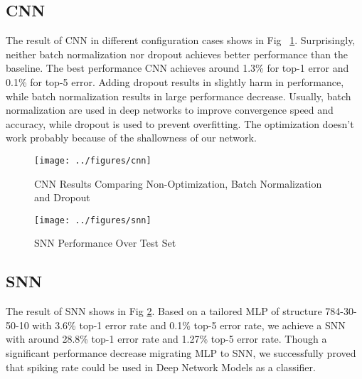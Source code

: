 \documentclass[10pt,twocolumn,letterpaper]{article}
\begin{document}
\subsection{ CNN }
The result of CNN in different configuration cases shows in Fig ~\ref{fig:cnn}. Surprisingly, neither batch normalization nor dropout achieves better performance than the baseline. The best performance CNN achieves around 1.3\% for top-1 error and 0.1\% for top-5 error. Adding dropout results in slightly harm in performance, while batch normalization results in large performance decrease. Usually, batch normalization are used in deep networks to improve convergence speed and accuracy, while dropout is used to prevent overfitting. The optimization doesn't work probably because of the shallowness of our network. 
\begin{figure}[t]
\begin{center}
   \texttt{[image: ../figures/cnn]}
\end{center}
   \caption{CNN Results Comparing Non-Optimization, Batch Normalization and Dropout}
\label{fig:cnn}
\end{figure}


\begin{figure}[t]
\begin{center}
   \texttt{[image: ../figures/snn]}
\end{center}
   \caption{SNN Performance Over Test Set}
\label{fig:snn}
\end{figure}

\subsection{SNN}
The result of SNN shows in Fig \ref{fig:snn}. Based on a tailored MLP of structure 784-30-50-10 with 
3.6\% top-1 error rate and 0.1\% top-5 error rate, we achieve a SNN with around 28.8\% top-1 error rate and 1.27\% top-5 error rate. Though a significant performance decrease migrating MLP to SNN, we successfully proved that spiking rate could be used in Deep Network Models as a classifier.
\end{document}
